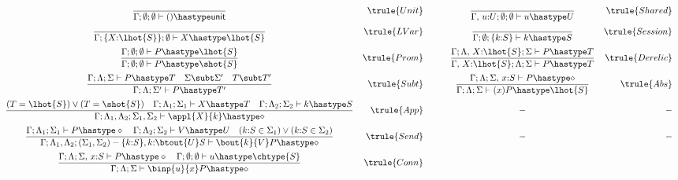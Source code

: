 \begin{figure}[!t]
\[
	\begin{array}{crccr}
	\displaystyle \frac{ }{\Gamma ; \emptyset; \emptyset \vdash \UnitV \hastype \Unit} & \trule{Unit} & 
	\quad & 
	\displaystyle \frac{ }{\Gamma, \, u{:}U ; \emptyset; \emptyset \vdash u \hastype U} & \trule{Shared} 
	\vspace{2mm}
	\\
	\displaystyle \frac{ }{\Gamma ; \{X{:}\lhot{S}\}; \emptyset \vdash X \hastype \lhot{S}} & \trule{LVar} & 
	\quad & 
	\displaystyle \frac{ }{\Gamma ; \emptyset ; \{k{:}S\} \vdash k \hastype S} & \trule{Session} 
	\vspace{2mm}
	\\
	\displaystyle \frac{\Gamma ; \emptyset; \emptyset \vdash P \hastype \lhot{S} }{\Gamma ; \emptyset; \emptyset \vdash P \hastype \shot{S}} & \trule{Prom} & 
	\quad & 
	\displaystyle \frac{ \Gamma ; \Lambda ,\, X{:}\lhot{S}; \Sigma \vdash P \hastype T }{ \Gamma,\, X{:}\lhot{S}; \Lambda ; \Sigma \vdash P \hastype T} & \trule{Derelic} 
	\vspace{2mm}
	\\
	\displaystyle \frac{\Gamma ; \Lambda; \Sigma \vdash P \hastype T  \quad \Sigma \subt \Sigma' \quad T \subt T'}{\Gamma ; \Lambda; \Sigma' \vdash P \hastype T'} & \trule{Subt} & 
	\quad & 
	\displaystyle \frac{ \Gamma ; \Lambda; \Sigma,\, x{:} S \vdash P \hastype \Proc }{ \Gamma ; \Lambda; \Sigma \vdash (x)P \hastype \lhot{S}} & \trule{Abs} 
	\vspace{2mm}
	\\
	\displaystyle \frac{(T = \lhot{S}) \lor (T = \shot{S}) \quad \Gamma ; \Lambda_1; \Sigma_1 \vdash X \hastype T  \quad \Gamma ; \Lambda_2; \Sigma_2 \vdash k \hastype S}{\Gamma ; \Lambda_1, \Lambda_2; \Sigma_1, \Sigma_2 \vdash \appl{X}{k} \hastype \Proc} & \trule{App} & 
	\quad & 
	-  & - 
	\vspace{2mm}
	\\
	\displaystyle \frac{\Gamma ; \Lambda_1; \Sigma_1 \vdash P \hastype \Proc  \quad \Gamma ; \Lambda_2; \Sigma_2 \vdash V \hastype U  \quad (k{:}S \in \Sigma_1) \lor (k{:}S \in \Sigma_2) }{\Gamma ; \Lambda_1, \Lambda_2; (\Sigma_1, \Sigma_2)-\{k{:}S\}, k{:}\btout{U} S \vdash \bout{k}{V} P \hastype \Proc} & \trule{Send} & 
	\quad & 
	-  & - 
	\vspace{2mm}
	\\
	\displaystyle \frac{\Gamma ; \Lambda; \Sigma, \, x{:}S \vdash P \hastype \Proc  \quad \Gamma ; \emptyset; \emptyset \vdash u \hastype \chtype{S} }{\Gamma ; \Lambda; \Sigma \vdash \binp{u}{x} P \hastype \Proc} & \trule{Conn} & 

\end{array}\]
\end{figure}
